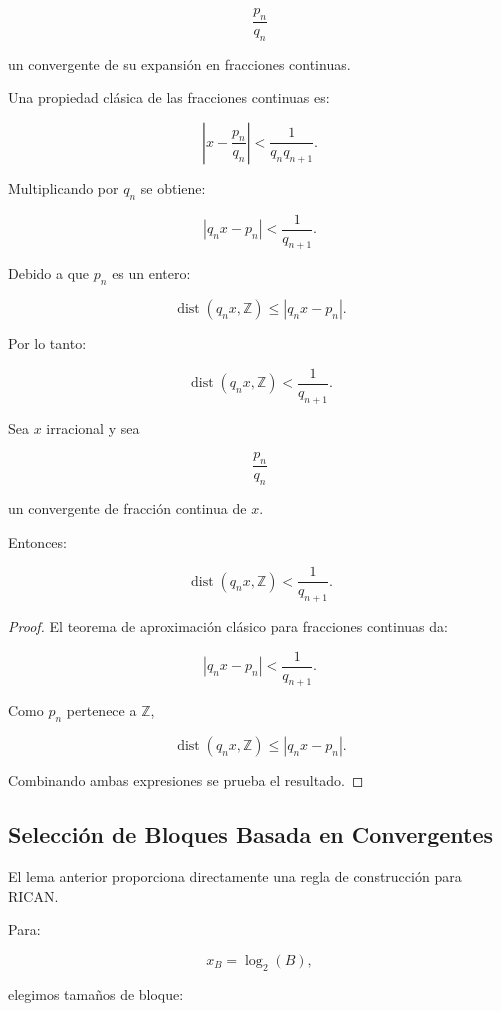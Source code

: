 \documentclass[onecolumn]{IEEEtran}
\begin{document}
\[
\frac{p_n}{q_n}
\]

un convergente de su expansión en fracciones continuas.

Una propiedad clásica de las fracciones continuas es:

\[
\left|
x-\frac{p_n}{q_n}
\right|
<
\frac{1}{q_nq_{n+1}} .
\]

Multiplicando por $q_n$ se obtiene:

\[
|q_nx-p_n|
<
\frac{1}{q_{n+1}} .
\]

Debido a que $p_n$ es un entero:

\[
\operatorname{dist}(q_nx,\mathbb{Z})
\leq
|q_nx-p_n|.
\]

Por lo tanto:

\[
\operatorname{dist}(q_nx,\mathbb{Z})
<
\frac{1}{q_{n+1}} .
\]

\begin{lemma}
\label{lem:convergent}

Sea $x$ irracional y sea

\[
\frac{p_n}{q_n}
\]

un convergente de fracción continua de $x$.

Entonces:

\[
\operatorname{dist}(q_nx,\mathbb{Z})
<
\frac{1}{q_{n+1}} .
\]

\end{lemma}

\begin{proof}

El teorema de aproximación clásico para fracciones continuas da:

\[
|q_nx-p_n|
<
\frac{1}{q_{n+1}} .
\]

Como $p_n$ pertenece a $\mathbb{Z}$,

\[
\operatorname{dist}(q_nx,\mathbb{Z})
\leq
|q_nx-p_n|.
\]

Combinando ambas expresiones se prueba el resultado.

\end{proof}

\subsection{Selección de Bloques Basada en Convergentes}

El lema anterior proporciona directamente una regla de construcción
para RICAN.

Para:

\[
x_B=\log_2(B),
\]

elegimos tamaños de bloque:
\end{document}
